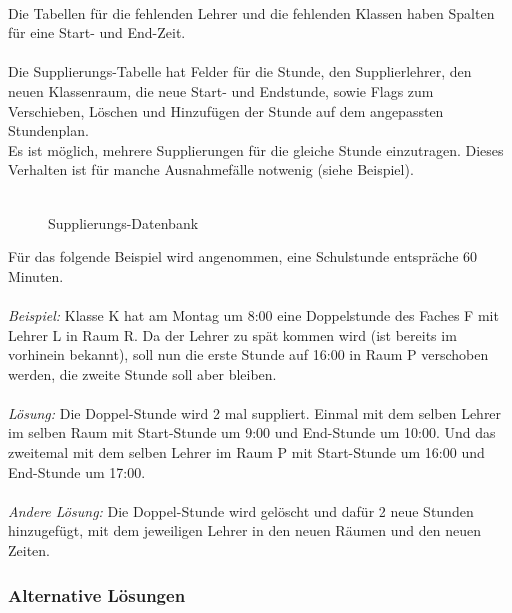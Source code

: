 \\
Die Tabellen für die fehlenden Lehrer und die fehlenden Klassen haben Spalten für eine Start- und End-Zeit.\\
\\
Die Supplierungs-Tabelle hat Felder für die Stunde, den Supplierlehrer, den neuen Klassenraum, die neue Start- und Endstunde, sowie Flags zum Verschieben, Löschen und Hinzufügen der Stunde auf dem angepassten Stundenplan.\\
Es ist möglich, mehrere Supplierungen für die gleiche Stunde einzutragen. Dieses Verhalten ist für manche Ausnahmefälle notwenig (siehe Beispiel).\\
\\
\begin{figure}[H]
\centering
{}
\caption{Supplierungs-Datenbank}
\end{figure}
Für das folgende Beispiel wird angenommen, eine Schulstunde entspräche 60 Minuten.\\
\\
\textit{Beispiel:} Klasse K hat am Montag um 8:00 eine Doppelstunde des Faches F mit Lehrer L in Raum R. Da der Lehrer zu spät kommen wird (ist bereits im vorhinein bekannt), soll nun die erste Stunde auf 16:00 in Raum P verschoben werden, die zweite Stunde soll aber bleiben.\\
\\
\textit{Lösung:} Die Doppel-Stunde wird 2 mal suppliert. Einmal mit dem selben Lehrer im selben Raum mit Start-Stunde um 9:00 und End-Stunde um 10:00. Und das zweitemal mit dem selben Lehrer im Raum P mit Start-Stunde um 16:00 und End-Stunde um 17:00.\\
\\
\textit{Andere Lösung:} Die Doppel-Stunde wird gelöscht und dafür 2 neue Stunden hinzugefügt, mit dem jeweiligen Lehrer in den neuen Räumen und den neuen Zeiten.

\subsubsection{Alternative Lösungen}

